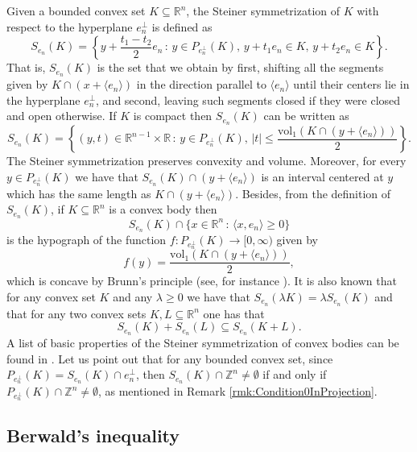 \documentclass[10pt]{amsart}
\def\R{\mathbb{R}}
\def\Z{\mathbb{Z}}
\def\vol{\mathrm{vol}}
\numberwithin{equation}{section}
\begin{document}
Given a bounded convex set $K\subseteq\R^n$, the Steiner symmetrization of $K$ with respect to the hyperplane $e_n^\perp$ is defined as
\begin{equation}\label{eq:SteinerSymmetrization}
S_{e_n}(K)=\left\{y+\frac{t_1-t_2}{2}e_n\,:\,y\in P_{e_n^\perp}(K),\,y+t_1e_n\in K,\,y+t_2e_n\in K\right\}.
\end{equation}
That is, $S_{e_n}(K)$ is the set that we obtain by first, shifting all the segments given by $K\cap(x+\langle e_n\rangle)$ in the direction parallel to $\langle e_n\rangle$ until their centers lie in the hyperplane $e_n^\perp$, and second, leaving such segments closed if they were closed and open otherwise. If $K$ is compact then $S_{e_n}(K)$ can be written as
\begin{equation}\label{eq:SteinerSymmetrization2}
S_{e_n}(K)=\left\{(y,t)\in\R^{n-1}\times\R\,:\,y\in P_{e_n^\perp}(K),\,|t|\leq\frac{\vol_1(K\cap(y+\langle e_n\rangle))}{2}\right\}.
\end{equation}
The Steiner symmetrization preserves convexity and volume. Moreover, for every $y\in P_{e_n^\perp}(K)$ we have that $S_{e_n}(K)\cap(y+\langle e_n\rangle)$ is an interval centered at $y$ which has the same length as $K\cap(y+\langle e_n\rangle)$. Besides, from the definition of $S_{e_n}(K)$, if $K\subseteq\R^n$ is a convex body then
$$
S_{e_n}(K)\cap\{x\in\R^n\,:\,\langle x,e_n\rangle\geq0\}
$$
is the hypograph of the function $f:P_{e_n^\perp}(K)\to[0,\infty)$ given by $$f(y)=\frac{\vol_1(K\cap(y+\langle e_n\rangle))}{2},$$ which is concave by Brunn's principle (see, for instance \cite[Theorem 1.2.2]{BGVV}). It is also known that for any convex set $K$ and any $\lambda\geq0$ we have that  $S_{e_n}(\lambda K)=\lambda S_{e_n}(K)$ and that for any two convex sets $K,L\subseteq\R^n$ one has that
\begin{equation}\label{eq:SteinerSymmetrizationInclusion}
S_{e_n}(K)+S_{e_n}(L)\subseteq S_{e_n}(K+L).
\end{equation}
A list of basic properties of the Steiner symmetrization of convex bodies can be found in \cite[Sections 1.1.7 and A.5]{AGM}. Let us point out that for any bounded convex set, since $P_{e_n^\perp}(K)=S_{e_n}(K)\cap e_n^\perp$, then $S_{e_n}(K)\cap\Z^n\neq\emptyset$ if and only if $P_{e_n^\perp}(K)\cap\Z^n\neq\emptyset$, as mentioned in Remark \ref{rmk:Condition0InProjection}.
\subsection{Berwald's inequality}
\end{document}
